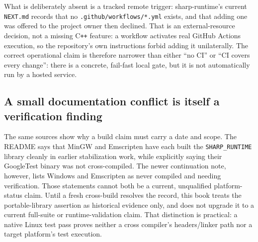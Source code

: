 What is deliberately absent is a tracked remote trigger: sharp-runtime's current \texttt{NEXT.md}
records that no \texttt{.github/workflows/*.yml} exists, and that adding one was offered to the
project owner then declined. That is an external-resource decision, not a missing C\texttt{++}
feature: a workflow activates real GitHub Actions execution, so the repository's own instructions
forbid adding it unilaterally. The correct operational claim is therefore narrower than either
``no CI'' or ``CI covers every change'': there is a concrete, fail-fast local gate, but it is
not automatically run by a hosted service.

\subsection{A small documentation conflict is itself a verification finding}

The same sources show why a build claim must carry a date and scope. The README says that
MinGW and Emscripten have each built the \texttt{SHARP\_RUNTIME} library cleanly in earlier
stabilization work, while explicitly saying their GoogleTest binary was not cross-compiled.
The newer continuation note, however, lists Windows and Emscripten as never compiled and needing
verification. Those statements cannot both be a current, unqualified platform-status claim.
Until a fresh cross-build resolves the record, this book treats the portable-library assertion as
historical evidence only, and does not upgrade it to a current full-suite or runtime-validation
claim. That distinction is practical: a native Linux test pass proves neither a cross compiler's
headers/linker path nor a target platform's test execution.
